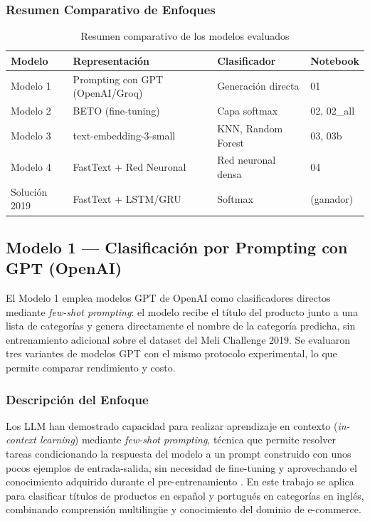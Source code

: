 \documentclass[11pt,a4paper]{article}
\begin{document}
\subsubsection{Resumen Comparativo de Enfoques}

\begin{table}[H]
\centering
\caption{Resumen comparativo de los modelos evaluados}
\small
\begin{tabular}{llll}
\toprule
Modelo & Representación & Clasificador & Notebook \\
\midrule
Modelo 1 & Prompting con GPT (OpenAI/Groq) & Generación directa & 01 \\
Modelo 2 & BETO (fine-tuning) & Capa softmax & 02, 02\_all \\
Modelo 3 & text-embedding-3-small & KNN, Random Forest & 03, 03b \\
Modelo 4 & FastText + Red Neuronal & Red neuronal densa & 04 \\
Solución 2019 & FastText + LSTM/GRU & Softmax & (ganador) \\
\bottomrule
\end{tabular}
\label{tab:modelos}
\end{table}

\subsection{Modelo 1 --- Clasificación por Prompting con GPT (OpenAI)}
\label{sec:modelo1}

El Modelo 1 emplea modelos GPT de OpenAI como clasificadores directos mediante \emph{few-shot prompting}: el modelo recibe el título del producto junto a una lista de categorías y genera directamente el nombre de la categoría predicha, sin entrenamiento adicional sobre el dataset del Meli Challenge 2019. Se evaluaron tres variantes de modelos GPT con el mismo protocolo experimental, lo que permite comparar rendimiento y costo.

\subsubsection{Descripción del Enfoque}

Los LLM han demostrado capacidad para realizar aprendizaje en contexto (\emph{in-context learning}) mediante \emph{few-shot prompting}, técnica que permite resolver tareas condicionando la respuesta del modelo a un prompt construido con unos pocos ejemplos de entrada-salida, sin necesidad de fine-tuning y aprovechando el conocimiento adquirido durante el pre-entrenamiento \cite{zhao2023}. En este trabajo se aplica para clasificar títulos de productos en español y portugués en categorías en inglés, combinando comprensión multilingüe y conocimiento del dominio de e-commerce.
\end{document}
